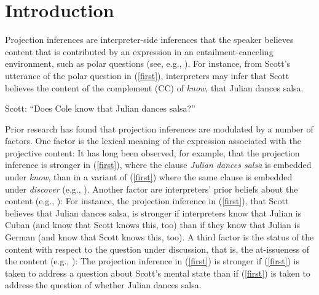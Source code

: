 \documentclass[11pt,fleqn]{article}
\newcommand{\6}{\mbox{$[\hspace*{-.6mm}[$}}
\newcommand{\9}{\mbox{$]\hspace*{-.6mm}]$}}
\begin{document}
\clearpage
{} 

\newpage


\section{Introduction}\label{s1}

Projection inferences are interpreter-side inferences that the speaker believes content that is contributed by an expression in an entailment-canceling environment, such as polar questions (see, e.g., \citealt{kiparsky-kiparsky70,potts05}). For instance, from Scott's utterance of the polar question in (\ref{first}), interpreters may infer that Scott believes the content of the complement (CC) of {\em know}, that Julian dances salsa. 

\begin{exe}
\ex\label{first} Scott: ``Does Cole know that Julian dances salsa?''
\end{exe}

Prior research has found that projection inferences are modulated by a number of factors. One factor is the lexical meaning of the expression associated with the projective content: It has long been observed, for example, that the projection inference is stronger in (\ref{first}), where the clause {\em Julian dances salsa} is embedded under {\em know}, than in a variant of (\ref{first}) where the same clause is embedded  under {\em discover} (e.g., \citealt{karttunen71b,tbd-variability,degen-tonhauser-language}). Another factor are interpreters' prior beliefs about the content (e.g., \citealt{mahler2020,degen-tonhauser-openmind}): For instance, the projection inference in (\ref{first}), that Scott believes that Julian dances salsa, is stronger if interpreters know that Julian is Cuban (and know that Scott knows this, too) than if they know that Julian is German (and know that Scott knows this, too). A third factor is the status of the content with respect to the question under discussion, that is, the at-issueness of the content (e.g., \citealt{brst-salt10,cummins-rohde2015,tonhauser-salt26,tbd-variability,djaerv-bacovcin-salt27,djaerv-bacovcin2020}): The projection inference in (\ref{first}) is stronger if (\ref{first}) is taken to address a question about Scott's mental state than if (\ref{first}) is taken to address the question of whether Julian dances salsa.
\end{document}
